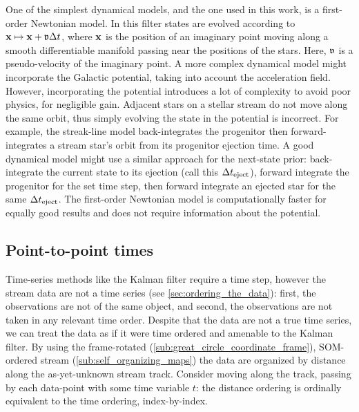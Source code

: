\documentclass[fleqn,usenatbib]{mnras}
\begin{document}


    One of the simplest dynamical models, and the one used in this work, is a
    first-order Newtonian model. In this filter states are evolved according to
    $\mathbf{x} \mapsto \mathbf{x} + \mathfrak{v} \Delta t$, where $\mathbf{x}$ is the
    position of an imaginary point moving along a smooth differentiable manifold
    passing near the positions of the stars. Here, $\mathfrak{v}$ is a
    pseudo-velocity of the imaginary point. A more complex dynamical model might
    incorporate the Galactic potential, taking into account the acceleration
    field. However, incorporating the potential introduces a lot of complexity
    to avoid poor physics, for negligible gain. Adjacent stars on a stellar
    stream do not move along the same orbit, thus simply evolving the state in
    the potential is incorrect. For example, the streak-line model
    \citep{Kupper2012} back-integrates the progenitor then forward-integrates a
    stream star's orbit from its progenitor ejection time. A good dynamical
    model might use a similar approach for the next-state prior: back-integrate
    the current state to its ejection (call this $\Delta t_{\rm{eject}}$),
    forward integrate the progenitor for the set time step, then forward
    integrate an ejected star for the same $\Delta t_{\rm{eject}}$. The
    first-order Newtonian model is computationally faster for equally good
    results and does not require information about the potential.

  \subsection{Point-to-point times} \label{sub:distances_as_times}

    Time-series methods like the Kalman filter require a time step, however the
    stream data are not a time series (see \autoref{sec:ordering_the_data}):
    first, the observations are not of the same object, and second, the
    observations are not taken in any relevant time order. Despite that the data
    are not a true time series, we can treat the data as if it were time ordered
    and amenable to the Kalman filter. By using the frame-rotated
    (\autoref{sub:great_circle_coordinate_frame}), SOM-ordered stream
    (\ref{sub:self_organizing_maps}) the data are organized by distance along
    the as-yet-unknown stream track. Consider moving along the track, passing by
    each data-point with some time variable $t$: the distance ordering is
    ordinally equivalent to the time ordering, index-by-index.
\end{document}
